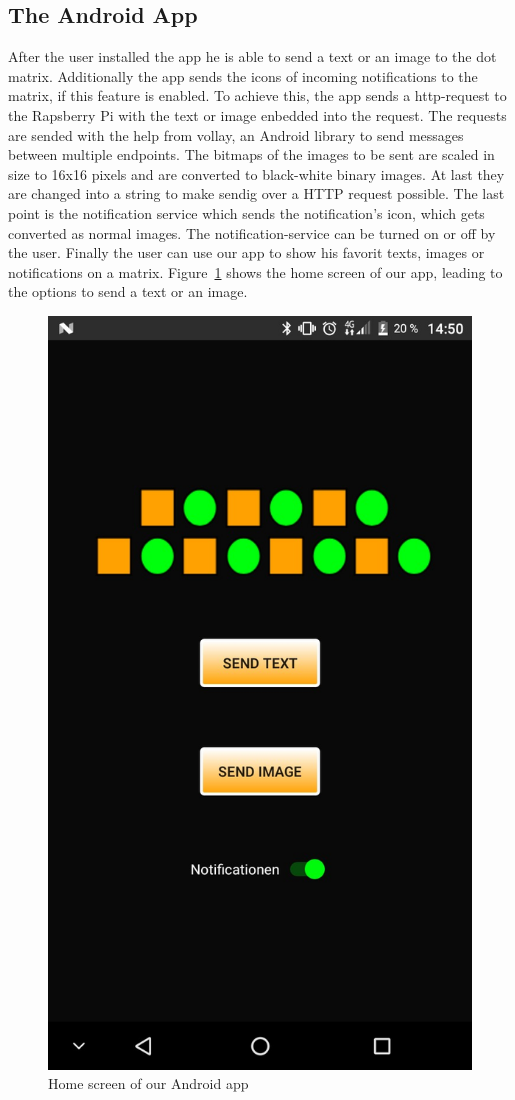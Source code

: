 \documentclass[conference]{IEEEtran}
\begin{document}
\subsection{The Android App}
After the user installed the app he is able to send a text or an image to the dot matrix. Additionally the app sends the icons of incoming notifications to the matrix, if this feature is enabled. To achieve this, the app sends a http-request to the Rapsberry Pi with the text or image enbedded into the request. The requests are sended with the help from vollay, an Android library to send messages between multiple endpoints. The bitmaps of the images to be sent are scaled in size to 16x16 pixels and are converted to black-white binary images. At last they are changed into a string to make sendig over a HTTP request possible. The last point is the notification service which sends the notification's icon, which gets converted as normal images. The notification-service can be turned on or off by the user. Finally the user can use our app to show his favorit texts, images or notifications on a matrix. Figure~\ref{FIG:APP} shows the home screen of our app, leading to the options to send a text or an image.

\begin{figure}[ht]
\centering
\includegraphics[width=0.75\linewidth]{pics/AppHomeScreen}
\caption{Home screen of our Android app}
\label{FIG:APP}
\end{figure}
\end{document}
